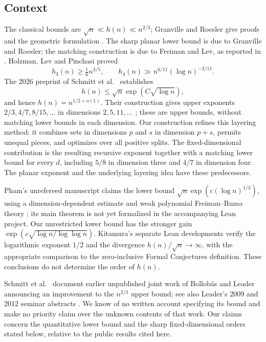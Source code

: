 \documentclass[11pt]{amsart}
\theoremstyle{definition}
\theoremstyle{remark}
\begin{document}
\subsection*{Context}
The classical bounds are $\sqrt n\ll h(n)\ll n^{2/3}$; Granville and Roesler give proofs and the geometric formulation \cite{GR99}. The sharp planar lower bound is due to Granville and Roesler; the matching construction is due to Freiman and Lev, as reported in \cite{GR99}. Holzman, Lev and Pinchasi \cite{HLP08} proved
\[
h_3(n)\ge\tfrac16n^{3/5},\qquad
h_4(n)\gg n^{6/11}(\log n)^{-2/11}.
\]
The 2026 preprint of Schmitt et al.\ \cite[Appendix A]{PC26} establishes
\begin{equation}\label{eq:known-upper}
h(n)\le\sqrt n\exp(C\sqrt{\log n}),
\end{equation}
and hence $h(n)=n^{1/2+o(1)}$. Their construction gives upper exponents $2/3,4/7,8/15,\ldots$ in dimensions $2,5,11,\ldots$ \cite[Propositions A.7--A.8]{PC26}; these are upper bounds, without matching lower bounds in each dimension. Our construction refines this layering method: it combines sets in dimensions $p$ and $s$ in dimension $p+s$, permits unequal pieces, and optimizes over all positive splits. The fixed-dimensional contribution is the resulting recursive exponent together with a matching lower bound for every $d$, including $5/8$ in dimension three and $4/7$ in dimension four. The planar exponent and the underlying layering idea have these predecessors.

Pham's unrefereed manuscript \cite{Ph26} claims the lower bound $\sqrt n\exp(c(\log n)^{1/3})$, using a dimension-dependent estimate and weak polynomial Freiman--Ruzsa theory \cite{GGMT}; its main theorem is not yet formalized in the accompanying Lean project. Our unrestricted lower bound has the stronger gain $\exp(c\sqrt{\log n/\log\log n})$. Kitamura's separate Lean developments \cite{Ki26,KiExp26} verify the logarithmic exponent $1/2$ and the divergence $h(n)/\sqrt n\to\infty$, with the appropriate comparison to the zero-inclusive Formal Conjectures definition. These conclusions do not determine the order of $h(n)$.

Schmitt et al.\ \cite[Appendix A, ``Relation to prior announcements'']{PC26} document earlier unpublished joint work of Bollob\'as and Leader announcing an improvement to the $n^{2/3}$ upper bound; see also Leader's 2009 and 2012 seminar abstracts \cite{Le09,Le12}. We know of no written account specifying its bound and make no priority claim over the unknown contents of that work. Our claims concern the quantitative lower bound and the sharp fixed-dimensional orders stated below, relative to the public results cited here.
\end{document}
